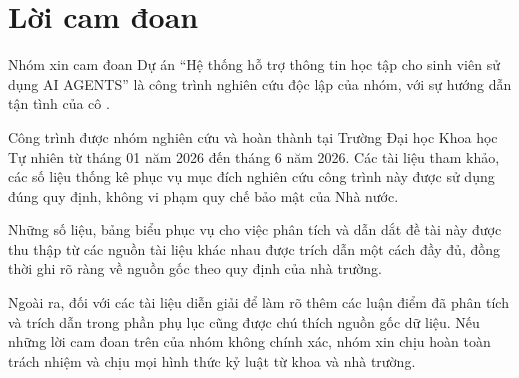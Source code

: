 \chapter*{Lời cam đoan}
\label{reassurances}

Nhóm xin cam đoan Dự án “Hệ thống hỗ trợ thông tin học tập cho sinh viên sử dụng AI AGENTS” là công trình nghiên cứu độc lập của nhóm, với sự hướng dẫn tận tình của cô \tenGVHD.

Công trình được nhóm nghiên cứu và hoàn thành tại Trường Đại học Khoa học Tự
nhiên từ tháng 01 năm 2026 đến tháng 6 năm 2026.
Các tài liệu tham khảo, các số liệu thống kê phục vụ mục đích nghiên cứu công
trình này được sử dụng đúng quy định, không vi phạm quy chế bảo mật của Nhà nước.

Những số liệu, bảng biểu phục vụ cho việc phân tích và dẫn dắt đề tài này được thu
thập từ các nguồn tài liệu khác nhau được trích dẫn một cách đầy đủ, đồng thời ghi rõ
ràng về nguồn gốc theo quy định của nhà trường.

Ngoài ra, đối với các tài liệu diễn giải để làm rõ thêm các luận điểm đã phân tích
và trích dẫn trong phần phụ lục cũng được chú thích nguồn gốc dữ liệu.
Nếu những lời cam đoan trên của nhóm không chính xác, nhóm xin chịu hoàn toàn
trách nhiệm và chịu mọi hình thức kỷ luật từ khoa và nhà trường.